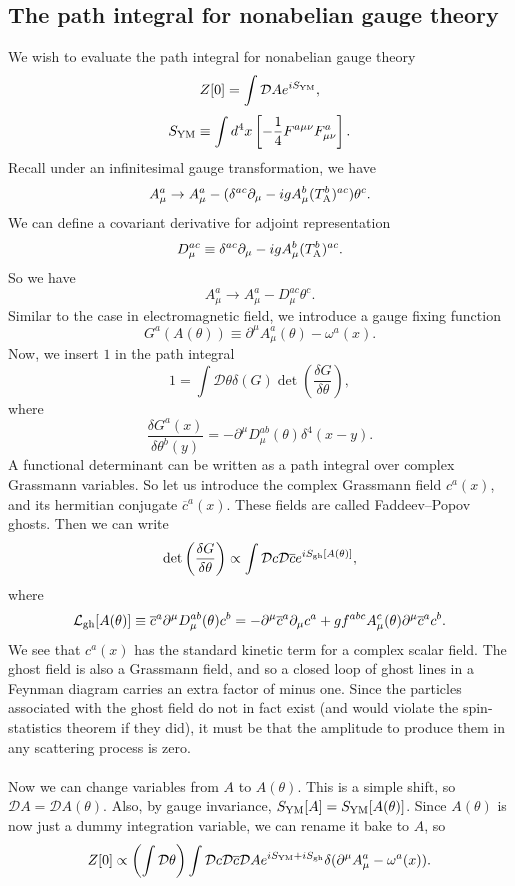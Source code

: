 \subsection{The path integral for nonabelian gauge theory}
We wish to evaluate the path integral for nonabelian gauge theory
\[Z[0] = \int \mathcal{D}A e^{iS_{\rm YM}},\]
\[S_{\rm YM} \equiv \int d^4x \left[-\frac{1}{4}F^{a\mu\nu}F^{a}_{\mu\nu} \right].\]
Recall under an infinitesimal gauge transformation, we have
\[A^{a}_{\mu} \to A^{a}_{\mu} -(\delta^{ac}\partial_{\mu}-igA^{b}_{\mu}(T_{\rm A}^{b})^{ac})\theta^c.\]
We can define a covariant derivative for adjoint representation
\[D_{\mu}^{ac} \equiv \delta^{ac}\partial_{\mu}-igA^{b}_{\mu}(T_{\rm A}^{b})^{ac}.\]
So we have
\[A^{a}_{\mu} \to A^{a}_{\mu} - D_{\mu}^{ac}\theta^c.\]
Similar to the case in electromagnetic field, we introduce a gauge fixing function
\[G^a(A(\theta)) \equiv \partial^{\mu}A^a_{\mu}(\theta)  - \omega^a(x).\]
Now, we insert $1$ in the path integral
\[1 = \int \mathcal{D}\theta \delta(G) \det\left( \frac{\delta G}{\delta \theta} \right),\]
where
\[\frac{\delta G^a(x)}{\delta \theta^b(y)} = -\partial^{\mu}D_{\mu}^{ab}(\theta)\delta^4(x-y).\]
A functional determinant can be written as a path integral over complex Grassmann variables. So let us introduce the complex Grassmann field $c^a(x)$, and its hermitian conjugate $\overline{c}^a(x)$. These fields are called Faddeev–Popov ghosts. Then we can write
\[ \det\left( \frac{\delta G}{\delta \theta} \right) \propto \int \mathcal{D}c \mathcal{D}\overline{c} e^{iS_{\rm gh}[A(\theta)]},\]
where
\[\mathcal{L}_{\rm gh}[A(\theta)] \equiv \overline{c}^a \partial^{\mu}D^{ab}_{\mu}(\theta)c^b = -\partial^{\mu}\overline{c}^a \partial_{\mu}c^a + gf^{abc}A^c_{\mu}(\theta)\partial^{\mu}\overline{c}^a c^b.\]
We see that $c^a(x)$ has the standard kinetic term for a complex scalar field.  The ghost field is also a Grassmann field, and so a closed loop of ghost lines in a Feynman diagram carries an extra factor of minus one. Since the particles associated with the ghost field do not in fact exist (and would violate the spin-statistics theorem if they did), it must be that the amplitude to produce them in any scattering process is zero.
\\ \\
Now we can change variables from $A$ to $A(\theta)$. This is a simple shift, so $\mathcal{D}A = \mathcal{D}A(\theta)$. Also, by gauge invariance, $S_{\rm YM}[A] = S_{\rm YM}[A(\theta)]$. Since $A(\theta)$ is now just a dummy integration variable, we can rename it bake to $A$, so
\[Z[0] \propto \left(\int \mathcal{D}\theta\right) \int \mathcal{D}c \mathcal{D}\overline{c} \mathcal{D}A e^{iS_{\rm YM} + iS_{\rm gh}} \delta(\partial^{\mu}A^a_{\mu}-\omega^a(x)).\]
